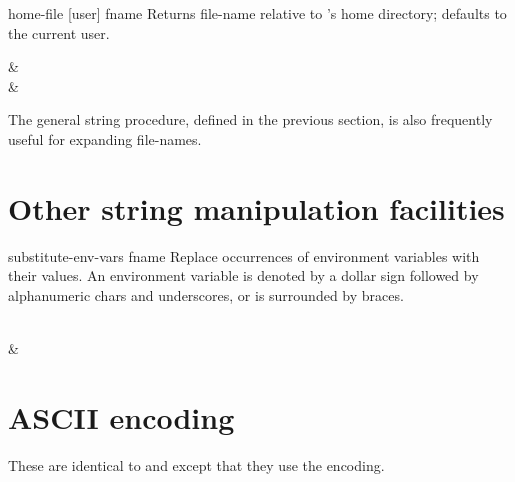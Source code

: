 \begin{defundesc} {home-file} {[user] fname} \str
    Returns file-name  relative to 's home directory;
     defaults to the current user.
%    
    \begin{exampletable}
                &         \\
       & 
    \end{exampletable}
\end{defundesc}

The general  string procedure, 
defined in the previous section,
is also frequently useful for expanding file-names.


\section{Other string manipulation facilities}

\begin{defundesc} {substitute-env-vars} {fname} \str
    Replace occurrences of environment variables with their values.
    An environment variable is denoted by a dollar sign followed by
    alphanumeric chars and underscores, or is surrounded by braces.

    \begin{exampletable}
              {}  \\
      & 
    \end{exampletable}
\end{defundesc}


\section{ASCII encoding}

    \integer
{} \character
\begin{desc}
  These are identical to  and  except that
  they use the {\Ascii} encoding.
\end{desc}

